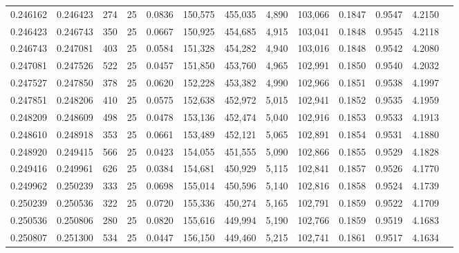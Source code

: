 \begin{tabular}{rrrrrrrrrrrrr}
0.246162 & 0.246423 &   274 &  25 &                                     0.0836 & 150,575 & 455,035 &   4,890 & 103,066 & 0.1847 & 0.9547 & 4.2150 \\
0.246423 & 0.246743 &   350 &  25 &                                     0.0667 & 150,925 & 454,685 &   4,915 & 103,041 & 0.1848 & 0.9545 & 4.2118 \\
0.246743 & 0.247081 &   403 &  25 &                                     0.0584 & 151,328 & 454,282 &   4,940 & 103,016 & 0.1848 & 0.9542 & 4.2080 \\
0.247081 & 0.247526 &   522 &  25 &                                     0.0457 & 151,850 & 453,760 &   4,965 & 102,991 & 0.1850 & 0.9540 & 4.2032 \\
0.247527 & 0.247850 &   378 &  25 &                                     0.0620 & 152,228 & 453,382 &   4,990 & 102,966 & 0.1851 & 0.9538 & 4.1997 \\
0.247851 & 0.248206 &   410 &  25 &                                     0.0575 & 152,638 & 452,972 &   5,015 & 102,941 & 0.1852 & 0.9535 & 4.1959 \\
0.248209 & 0.248609 &   498 &  25 &                                     0.0478 & 153,136 & 452,474 &   5,040 & 102,916 & 0.1853 & 0.9533 & 4.1913 \\
0.248610 & 0.248918 &   353 &  25 &                                     0.0661 & 153,489 & 452,121 &   5,065 & 102,891 & 0.1854 & 0.9531 & 4.1880 \\
0.248920 & 0.249415 &   566 &  25 &                                     0.0423 & 154,055 & 451,555 &   5,090 & 102,866 & 0.1855 & 0.9529 & 4.1828 \\
0.249416 & 0.249961 &   626 &  25 &                                     0.0384 & 154,681 & 450,929 &   5,115 & 102,841 & 0.1857 & 0.9526 & 4.1770 \\
0.249962 & 0.250239 &   333 &  25 &                                     0.0698 & 155,014 & 450,596 &   5,140 & 102,816 & 0.1858 & 0.9524 & 4.1739 \\
0.250239 & 0.250536 &   322 &  25 &                                     0.0720 & 155,336 & 450,274 &   5,165 & 102,791 & 0.1859 & 0.9522 & 4.1709 \\
0.250536 & 0.250806 &   280 &  25 &                                     0.0820 & 155,616 & 449,994 &   5,190 & 102,766 & 0.1859 & 0.9519 & 4.1683 \\
0.250807 & 0.251300 &   534 &  25 &                                     0.0447 & 156,150 & 449,460 &   5,215 & 102,741 & 0.1861 & 0.9517 & 4.1634 \\

\end{tabular}
